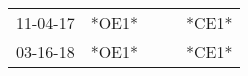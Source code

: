 \begin{supertabular}{p{0.07\textwidth}p{0.06\textwidth}p{0.02\textwidth}p{0.02\textwidth}p{0.06\textwidth}}
 11-04-17\textsuperscript{} &  *OE1* &   &   &  *CE1* \\
 03-16-18\textsuperscript{} &  *OE1* &   &   &  *CE1* \\
\end{supertabular}
